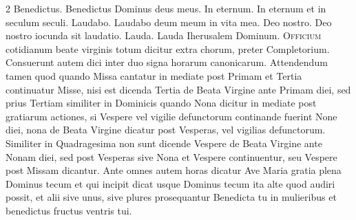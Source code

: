 \begin{multicols*}{2}
 Benedictus.
 Benedictus Dominus deus meus.
 In eternum.
 In eternum et in seculum seculi.
 Laudabo.
 Laudabo deum meum in vita mea.
 Deo nostro.
 Deo nostro iocunda sit laudatio.
 Lauda.
 Lauda Iherusalem Dominum.
\color{Red} 
\lettrine[lines=2]{\zallmancaps \color{Blue} O}{fficium} cotidianum beate virginis totum dicitur extra chorum, preter Completorium. Consuerunt autem dici inter duo signa horarum canonicarum. Attendendum tamen quod quando Missa cantatur in mediate post Primam et Tertia continuatur Misse, nisi est dicenda Tertia de Beata Virgine ante Primam diei, sed prius Tertiam similiter in Dominicis quando Nona dicitur in mediate post gratiarum actiones, si Vespere vel vigilie defunctorum continande fuerint None diei, nona de Beata Virgine dicatur post Vesperas, vel vigilias defunctorum. Similiter in Quadragesima non sunt dicende Vespere de Beata Virgine ante Nonam diei, sed post Vesperas sive Nona et Vespere continuentur, seu Vespere post Missam dicantur. Ante omnes autem horas dicatur {\color{black} Ave Maria gratia plena Dominus tecum} et qui incipit dicat usque {\color{black} Dominus tecum} ita alte quod audiri possit, et alii sive unus, sive plures prosequantur {\color{black} Benedicta tu in mulieribus et benedictus fructus ventris tui.} \color{black}

\end{multicols*}
